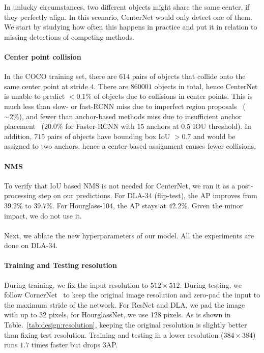 \documentclass[10pt,twocolumn,letterpaper]{article}
\begin{document}
In unlucky circumstances, two different objects might share the same center, if they perfectly align.
In this scenario, CenterNet would only detect one of them.
We start by studying how often this happens in practice and put it in relation to missing detections of competing methods.

\paragraph{Center point collision}
In the COCO training set, there are $614$ pairs of objects that collide onto the same center point at stride $4$.
There are $860001$ objects in total, hence CenterNet is unable to predict $<0.1\%$ of objects due to collisions in center points.
This is much less than slow- or fast-RCNN miss due to imperfect region proposals~\cite{uijlings2013selective} ($\sim 2\%$), and fewer than anchor-based methods miss due to insufficient anchor placement~\cite{ren2015faster} ($20.0\%$ for Faster-RCNN with $15$ anchors at $0.5$ IOU threshold).
In addition, $715$ pairs of objects have bounding box IoU $>0.7$ and would be assigned to two anchors, hence a center-based assignment causes fewer collisions.

\paragraph{NMS}
To verify that IoU based NMS is not needed for CenterNet, 
we ran it as a post-processing step on our predictions.
For DLA-34 (flip-test), the AP improves from $39.2\%$ to $39.7\%$. 
For Hourglass-104, the AP stays at $42.2\%$.
Given the minor impact, we do not use it.
\\ \\
Next, we ablate the new hyperparameters of our model.
All the experiments are done on DLA-34.

\paragraph{Training and Testing resolution}
During training, we fix the input resolution to $512 \times 512$.
During testing, we follow CornerNet~\cite{Law_2018_ECCV} to keep the original image resolution and zero-pad the input to the maximum stride of the network.
For ResNet and DLA, we pad the image with up to 32 pixels, for HourglassNet, we use 128 pixels.
As is shown in Table.~\ref{tab:design:resolution}, keeping the original resolution is slightly better than fixing test resolution.
Training and testing in a lower resolution ($384 \times 384$) runs $1.7$ times faster but drops $3$AP.
\end{document}
